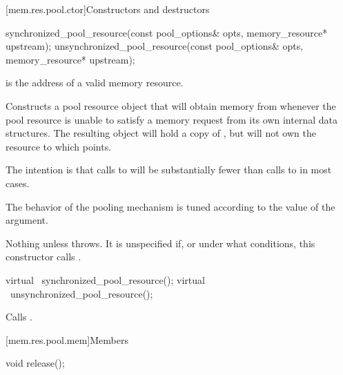 [mem.res.pool.ctor]{Constructors and destructors}

%
%
\begin{itemdecl}
synchronized_pool_resource(const pool_options& opts, memory_resource* upstream);
unsynchronized_pool_resource(const pool_options& opts, memory_resource* upstream);
\end{itemdecl}

\begin{itemdescr}
\pnum
\requires
{} is the address of a valid memory resource.

\pnum
\effects
Constructs a pool resource object that will obtain memory from 
whenever the pool resource is unable to satisfy a memory request
from its own internal data structures.
The resulting object will hold a copy of ,
but will not own the resource to which  points.
\begin{note}
The intention is that calls to 
will be substantially fewer than calls to 
in most cases.\end{note}
The behavior of the pooling mechanism is tuned
according to the value of the  argument.

\pnum
\throws
Nothing unless  throws.
It is unspecified if, or under what conditions,
this constructor calls .
\end{itemdescr}

%
%
\begin{itemdecl}
virtual ~synchronized_pool_resource();
virtual ~unsynchronized_pool_resource();
\end{itemdecl}

\begin{itemdescr}
\pnum
\effects
Calls .
\end{itemdescr}

[mem.res.pool.mem]{Members}

%
%
\begin{itemdecl}
void release();
\end{itemdecl}

